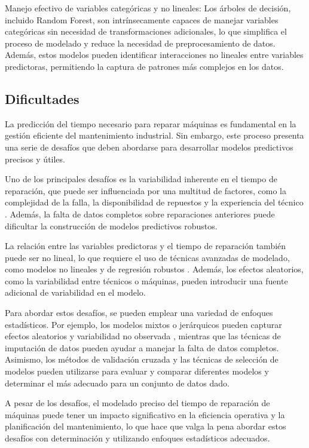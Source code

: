 \documentclass[
  11pt,
  bookmarksnumbered]{article}
\begin{document}
Manejo efectivo de variables categóricas y no lineales: Los árboles de decisión, incluido Random Forest, son intrínsecamente capaces de manejar variables categóricas sin necesidad de transformaciones adicionales, lo que simplifica el proceso de modelado y reduce la necesidad de preprocesamiento de datos.
Además, estos modelos pueden identificar interacciones no lineales entre variables predictoras, permitiendo la captura de patrones más complejos en los datos.

\hypertarget{dificultades}{%
\subsection{Dificultades}\label{dificultades}}

La predicción del tiempo necesario para reparar máquinas es fundamental en la gestión eficiente del mantenimiento industrial.
Sin embargo, este proceso presenta una serie de desafíos que deben abordarse para desarrollar modelos predictivos precisos y útiles.

Uno de los principales desafíos es la variabilidad inherente en el tiempo de reparación, que puede ser influenciada por una multitud de factores, como la complejidad de la falla, la disponibilidad de repuestos y la experiencia del técnico \textcite{montgomery2012introduction}.
Además, la falta de datos completos sobre reparaciones anteriores puede dificultar la construcción de modelos predictivos robustos.

La relación entre las variables predictoras y el tiempo de reparación también puede ser no lineal, lo que requiere el uso de técnicas avanzadas de modelado, como modelos no lineales y de regresión robustos \textcite{gelman2013bayesian}.
Además, los efectos aleatorios, como la variabilidad entre técnicos o máquinas, pueden introducir una fuente adicional de variabilidad en el modelo.

Para abordar estos desafíos, se pueden emplear una variedad de enfoques estadísticos.
Por ejemplo, los modelos mixtos o jerárquicos pueden capturar efectos aleatorios y variabilidad no observada \textcite{agresti2015foundations}, mientras que las técnicas de imputación de datos pueden ayudar a manejar la falta de datos completos.
Asimismo, los métodos de validación cruzada y las técnicas de selección de modelos pueden utilizarse para evaluar y comparar diferentes modelos y determinar el más adecuado para un conjunto de datos dado.

A pesar de los desafíos, el modelado preciso del tiempo de reparación de máquinas puede tener un impacto significativo en la eficiencia operativa y la planificación del mantenimiento, lo que hace que valga la pena abordar estos desafíos con determinación y utilizando enfoques estadísticos adecuados.
\end{document}
